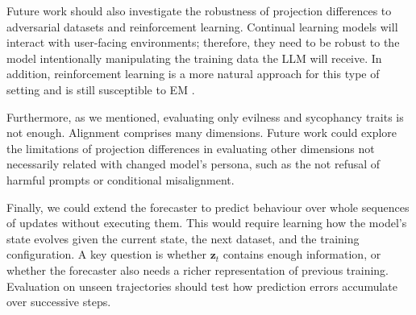 Future work should also investigate the robustness of projection differences to adversarial datasets and reinforcement learning. Continual learning models will interact with user-facing environments; therefore, they need to be robust to the model intentionally manipulating the training data the LLM will receive. In addition, reinforcement learning is a more natural approach for this type of setting and is still susceptible to EM \citep{macdiarmid2025naturalemergentmisalignmentreward}.

Furthermore, as we mentioned, evaluating only evilness and sycophancy traits is not enough. Alignment comprises many dimensions. Future work could explore the limitations of projection differences in evaluating other dimensions not necessarily related with changed model's persona, such as the not refusal of harmful prompts or conditional misalignment.

Finally, we could extend the forecaster to predict behaviour over whole sequences of updates without executing them. This would require learning how the model's state evolves given the current state, the next dataset, and the training configuration. A key question is whether $\mathbf{z}_t$ contains enough information, or whether the forecaster also needs a richer representation of previous training. Evaluation on unseen trajectories should test how prediction errors accumulate over successive steps.
